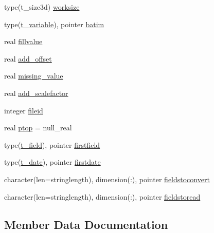 \begin{DoxyCompactItemize}
\item 
type(t\+\_\+size3d) \mbox{\hyperlink{structmoduleera40format_1_1t__era40format_ab0e83857a15b22f7a9ed974a7728ebb5}{worksize}}
\item 
type(\mbox{\hyperlink{structmoduleera40format_1_1t__variable}{t\+\_\+variable}}), pointer \mbox{\hyperlink{structmoduleera40format_1_1t__era40format_a8bf00798fda43d3267aca3d66252e2c8}{batim}}
\item 
real \mbox{\hyperlink{structmoduleera40format_1_1t__era40format_a9051233d767e29c6e4efa3356dbed962}{fillvalue}}
\item 
real \mbox{\hyperlink{structmoduleera40format_1_1t__era40format_a59846603407e59e494800bafd17e7d11}{add\+\_\+offset}}
\item 
real \mbox{\hyperlink{structmoduleera40format_1_1t__era40format_afb3af1ef28e13febe0e0daed86a17e37}{missing\+\_\+value}}
\item 
real \mbox{\hyperlink{structmoduleera40format_1_1t__era40format_ae012daaf2d71196c071dd3f3f532e141}{add\+\_\+scalefactor}}
\item 
integer \mbox{\hyperlink{structmoduleera40format_1_1t__era40format_a0874c4abf2d454619178498f1b3788d6}{fileid}}
\item 
real \mbox{\hyperlink{structmoduleera40format_1_1t__era40format_aa1cd2e23c9dcf8a8ee48ff2d559cbb66}{ptop}} = null\+\_\+real
\item 
type(\mbox{\hyperlink{structmoduleera40format_1_1t__field}{t\+\_\+field}}), pointer \mbox{\hyperlink{structmoduleera40format_1_1t__era40format_a92ae852553737572a1452f91405ef915}{firstfield}}
\item 
type(\mbox{\hyperlink{structmoduleera40format_1_1t__date}{t\+\_\+date}}), pointer \mbox{\hyperlink{structmoduleera40format_1_1t__era40format_a1e236a65f9e4c1bed9a4415a5d810600}{firstdate}}
\item 
character(len=stringlength), dimension(\+:), pointer \mbox{\hyperlink{structmoduleera40format_1_1t__era40format_a61c7b34d1002619fe4c910d83263d418}{fieldstoconvert}}
\item 
character(len=stringlength), dimension(\+:), pointer \mbox{\hyperlink{structmoduleera40format_1_1t__era40format_a0047301a32be902209fd2166d5f18ce0}{fieldstoread}}
\end{DoxyCompactItemize}


\subsection{Member Data Documentation}
\mbox{\label{structmoduleera40format_1_1t__era40format_a59846603407e59e494800bafd17e7d11}} 
